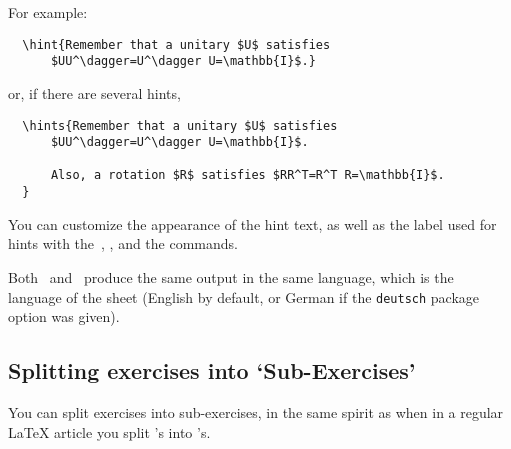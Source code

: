 \documentclass[11pt,a4paper]{article}
\begin{document}


For example:
\begin{pkgverbatim}
\begin{verbatim}
  \hint{Remember that a unitary $U$ satisfies
      $UU^\dagger=U^\dagger U=\mathbb{I}$.}
\end{verbatim}
\end{pkgverbatim}
or, if there are several hints,
\begin{pkgverbatim}
\begin{verbatim}
  \hints{Remember that a unitary $U$ satisfies
      $UU^\dagger=U^\dagger U=\mathbb{I}$.

      Also, a rotation $R$ satisfies $RR^T=R^T R=\mathbb{I}$.
  }
\end{verbatim}
\end{pkgverbatim}

\begin{pkgtip}
  You can customize the appearance of the hint text, as well as the label used for hints
  with the~, , and the
   commands.
\end{pkgtip}



\begin{pkgnotice}
  Both~ and~ produce the same output in the same
  language, which is the language of the sheet (English by default, or German if the
  \texttt{deutsch} package option was given).
\end{pkgnotice}


\subsection{Splitting exercises into `Sub-Exercises'}
\label{sec:subexercises}

You can split exercises into sub-exercises, in the same spirit as when in a regular
\LaTeX{} article you split 's into 's.
\end{document}
